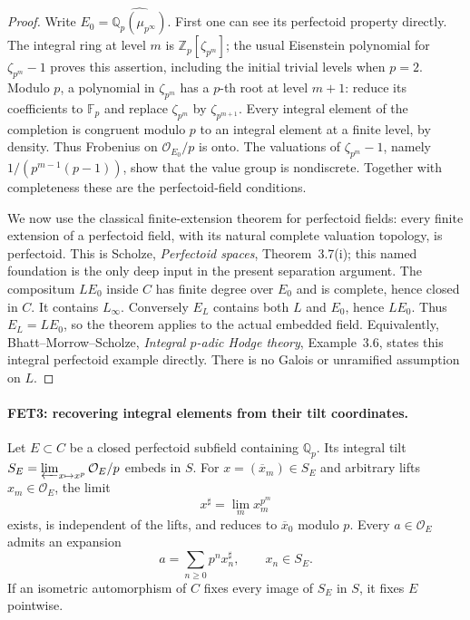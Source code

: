 \documentclass[11pt,a4paper]{article}
\numberwithin{equation}{section}
\theoremstyle{remark}\newtheorem{remark}[theorem]{Remark}
\begin{document}
\begin{proof}
Write $E_0=\widehat{\mathbb Q_p(\mu_{p^\infty})}$.
First one can see its perfectoid property directly. The integral
ring at level $m$ is $\mathbb Z_p[\zeta_{p^m}]$; the usual Eisenstein
polynomial for $\zeta_{p^m}-1$ proves this assertion, including the
initial trivial levels when $p=2$. Modulo $p$, a polynomial in
$\zeta_{p^m}$ has a $p$-th root at level $m+1$: reduce its
coefficients to $\mathbb F_p$ and replace $\zeta_{p^m}$ by
$\zeta_{p^{m+1}}$. Every integral element of the completion is
congruent modulo $p$ to an integral element at a finite level, by
density. Thus Frobenius on $\mathcal O_{E_0}/p$ is onto.
The valuations of $\zeta_{p^m}-1$, namely
$1/(p^{m-1}(p-1))$, show that the value group is nondiscrete.
Together with completeness these are the perfectoid-field conditions.

We now use the classical finite-extension theorem for perfectoid
fields: every finite extension of a perfectoid field, with its natural
complete valuation topology, is perfectoid. This is Scholze,
\emph{Perfectoid spaces}, Theorem~3.7(i); this named foundation is
the only deep input in the present separation argument.
The compositum $LE_0$ inside $C$ has finite degree over $E_0$ and
is complete, hence closed in $C$. It contains $L_\infty$.
Conversely $E_L$ contains both $L$ and $E_0$, hence $LE_0$.
Thus $E_L=LE_0$, so the theorem applies to the actual embedded field.
Equivalently, Bhatt--Morrow--Scholze, \emph{Integral $p$-adic Hodge
theory}, Example~3.6, states this integral perfectoid example directly.
There is no Galois or unramified assumption on $L$.
\end{proof}

\paragraph{FET3: recovering integral elements from their tilt coordinates.}
\label{claim:FET3}
Let $E\subset C$ be a closed perfectoid subfield containing
$\mathbb Q_p$. Its integral tilt
$S_E=\varprojlim_{x\mapsto x^p}\mathcal O_E/p$ embeds in $S$.
For $x=(\overline x_m)\in S_E$ and arbitrary lifts
$x_m\in\mathcal O_E$, the limit
\[
                     x^\sharp=\lim_m x_m^{p^m}             \tag{FET.2}
\]
exists, is independent of the lifts, and reduces to
$\overline x_0$ modulo $p$. Every $a\in\mathcal O_E$ admits an
expansion
\[
                      a=\sum_{n\geq0}p^n x_n^\sharp,
                      \qquad x_n\in S_E.                 \tag{FET.3}
\]
If an isometric automorphism of $C$ fixes every image of $S_E$ in
$S$, it fixes $E$ pointwise.
\end{document}
